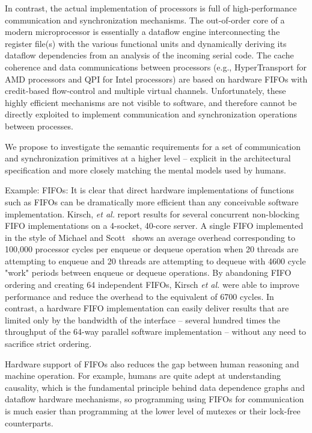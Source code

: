      In contrast, the actual implementation of processors is full of
     high-performance communication and synchronization mechanisms.
     The out-of-order core of a modern microprocessor is essentially a
     dataflow engine interconnecting the register file(s) with the
     various functional units and dynamically deriving its dataflow
     dependencies from an analysis of the incoming serial code.  The
     cache coherence and data communications between processors (e.g.,
     HyperTransport for AMD processors and QPI for Intel processors)
     are based on hardware FIFOs with credit-based flow-control and
     multiple virtual channels.  Unfortunately, these highly efficient
     mechanisms are not visible to software, and therefore cannot be
     directly exploited to implement communication and synchronization
     operations between processes.
     
     We propose to investigate the semantic requirements for a set of
     communication and synchronization primitives at a higher level --
     explicit in the architectural specification and more closely
     matching the mental models used by humans.
     
     Example: FIFOs: It is clear that direct hardware implementations
     of functions such as FIFOs can be dramatically more efficient
     than any conceivable software implementation.  Kirsch, \textit{et
       al.} report results for several concurrent non-blocking FIFO
     implementations on a 4-socket, 40-core server.  A single FIFO
     implemented in the style of Michael and
     Scott~\cite{michael1996simple} shows an average overhead
     corresponding to 100,000 processor cycles per enqueue or dequeue
     operation when 20 threads are attempting to enqueue and 20
     threads are attempting to dequeue with 4600 cycle "work" periods
     between enqueue or dequeue operations.  By abandoning FIFO
     ordering and creating 64 independent FIFOs, Kirsch \textit{et
       al.} were able to improve performance and reduce the overhead
     to the equivalent of 6700 cycles.  In contrast, a hardware FIFO
     implementation can easily deliver results that are limited only
     by the bandwidth of the interface -- several hundred times the
     throughput of the 64-way parallel software implementation --
     without any need to sacrifice strict ordering.
     
     Hardware support of FIFOs also reduces the gap between human
     reasoning and machine operation.  For example, humans are quite
     adept at understanding causality, which is the fundamental
     principle behind data dependence graphs and dataflow hardware
     mechanisms, so programming using FIFOs for communication is much
     easier than programming at the lower level of mutexes or their
     lock-free counterparts.
     
